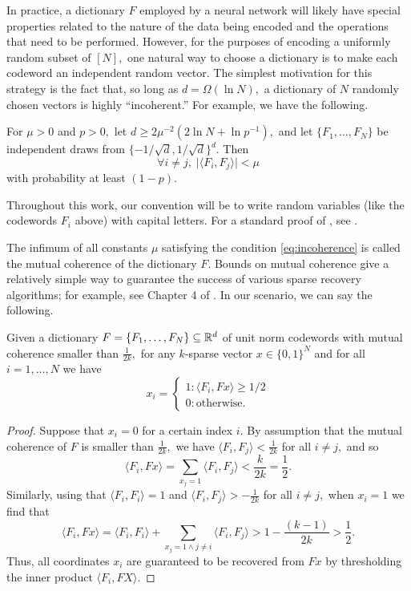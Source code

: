 In practice, a dictionary $F$ employed by a neural network will likely have special properties related to the nature of the data being encoded and the operations that need to be performed. However, for the purposes of encoding a uniformly random subset of $[N],$ one natural way to choose a dictionary is to make each codeword an independent random vector. The simplest motivation for this strategy is the fact that, so long as $d = \Omega(\ln N),$ a dictionary of $N$ randomly chosen vectors is highly ``incoherent.'' For example, we have the following.

\begin{proposition}
	\label{prop:many-ortho}
	For $\mu > 0$ and $p > 0,$ let $d \ge 2 \mu^{-2} (2 \ln N + \ln p^{-1}),$ and let $\{ F_1, \dots, F_N \}$ be independent draws from $\{-1/\sqrt d, 1/\sqrt d\}^d.$ Then
	\begin{equation}
	\forall i \neq j, \; \lvert \langle F_i, F_j \rangle \rvert < \mu \label{eq:incoherence}
	\end{equation}
	with probability at least $(1 - p).$
\end{proposition}

Throughout this work, our convention will be to write random variables (like the codewords $F_i$ above) with capital letters. For a standard proof of , see .

The infimum of all constants $\mu$ satisfying the condition \eqref{eq:incoherence} is called the mutual coherence of the dictionary $F$. Bounds on mutual coherence give a relatively simple way to guarantee the success of various sparse recovery algorithms; for example, see Chapter 4 of \citet{elad_sparse_2010}. In our scenario, we can say the following.

\begin{proposition}\label{prop:threshold}
	Given a dictionary $F = \{ F_1, \dots, F_N \} \subseteq \mathbb{R}^d$ of unit norm codewords with mutual coherence smaller than $\tfrac1{2k},$ for any $k$-sparse vector $x \in \{0,1\}^N$ and for all $i = 1, \dots, N$ we have
	$$
	x_i = \begin{cases}
 	  1 \colon \langle F_i, F x \rangle \ge 1/2 \\
 	  0 \colon \text{otherwise.}
    \end{cases}
	$$
\end{proposition}

\begin{proof}
Suppose that $x_i = 0$ for a certain index $i.$ By assumption that the mutual coherence of $F$ is smaller than $\tfrac1{2k},$ we have $\langle F_i, F_j \rangle < \tfrac1{2k}$ for all $i \neq j,$ and so
$$
\langle F_i, F x \rangle = \sum_{x_j = 1} \langle F_i, F_j \rangle < \frac k {2 k} = \frac 1 2.
$$
Similarly, using that $\langle F_i, F_i \rangle = 1$ and $\langle F_i, F_j \rangle > -\tfrac1{2k}$ for all $i \neq j,$ when $x_i = 1$ we find that
$$
\langle F_i, F x \rangle = \langle F_i, F_i \rangle + \sum_{x_j = 1 \land j \neq i} \langle F_i, F_j \rangle > 1 - \frac{(k - 1)}{2k} > \frac 1 2.
$$
Thus, all coordinates $x_i$ are guaranteed to be recovered from $F x$ by thresholding the inner product $\langle F_i, F X \rangle.$
\end{proof}

